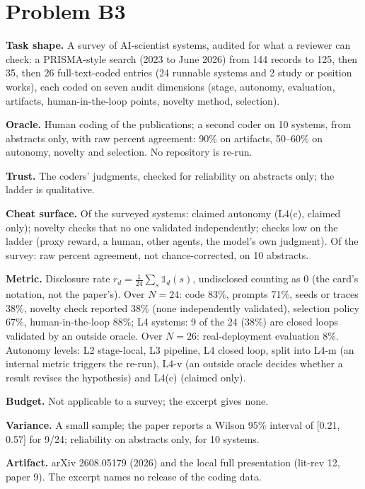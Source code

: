 \documentclass[11pt]{article}
\begin{document}
\section*{Problem B3}\label{ans:B3}
\begin{answer}
\textbf{Task shape.} A survey of AI-scientist systems, audited for what a
reviewer can check: a PRISMA-style search (2023 to June 2026) from 144
records to 125, then 35, then 26 full-text-coded entries (24 runnable systems
and 2 study or position works), each coded on seven audit dimensions (stage,
autonomy, evaluation, artifacts, human-in-the-loop points, novelty method,
selection).

\textbf{Oracle.} Human coding of the publications; a second coder on 10
systems, from abstracts only, with raw percent agreement: 90\% on artifacts,
50--60\% on autonomy, novelty and selection. No repository is re-run.

\textbf{Trust.} The coders' judgments, checked for reliability on abstracts
only; the ladder is qualitative.

\textbf{Cheat surface.} Of the surveyed systems: claimed autonomy (L4(c), claimed
only); novelty checks that no one validated independently; checks low on the
ladder (proxy reward, a human, other agents, the model's own judgment). Of the
survey: raw percent agreement, not chance-corrected, on 10 abstracts.

\textbf{Metric.} Disclosure rate $r_d = \frac{1}{24}\sum_s
\mathbb{1}_d(s)$, undisclosed counting as 0 (the card's notation, not the
paper's). Over $N = 24$: code 83\%, prompts 71\%, seeds or traces 38\%,
novelty check reported 38\% (none independently validated), selection policy
67\%, human-in-the-loop 88\%; L4 systems: 9 of the 24 (38\%) are closed
loops validated by an outside oracle. Over $N = 26$: real-deployment evaluation 8\%.
Autonomy levels: L2 stage-local, L3 pipeline, L4 closed loop, split into L4-m
(an internal metric triggers the re-run), L4-v (an outside oracle decides
whether a result revises the hypothesis) and L4(c) (claimed only).

\textbf{Budget.} Not applicable to a survey; the excerpt gives none.

\textbf{Variance.} A small sample; the paper reports a Wilson 95\% interval
of [0.21, 0.57] for 9/24; reliability on abstracts only, for 10 systems.

\textbf{Artifact.} arXiv 2608.05179 (2026) and the local full presentation
(lit-rev 12, paper 9). The excerpt names no release of the coding data.


\end{answer}
\end{document}
